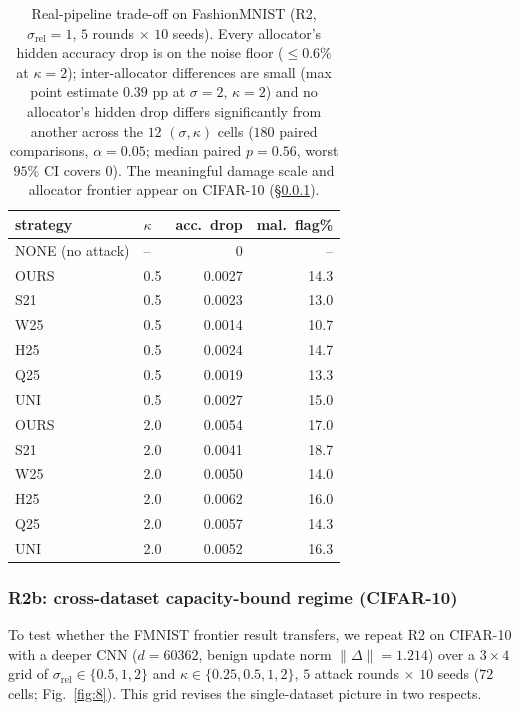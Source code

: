 \documentclass[final,1p,times]{elsarticle}
\begin{document}
\begin{table}[!t]
\centering
\caption{Real-pipeline trade-off on FashionMNIST (R2, $\sigma_{\mathrm{rel}}{=}1$,
$5$ rounds $\times$ $10$ seeds). Every allocator's hidden accuracy drop is
on the noise floor ($\le 0.6\%$ at $\kappa{=}2$); inter-allocator
differences are small (max point estimate $0.39$ pp at $\sigma{=}2$, $\kappa{=}2$)
and no allocator's hidden drop differs significantly from another across the
$12$ $(\sigma,\kappa)$ cells ($180$ paired comparisons, $\alpha{=}0.05$; median
paired $p{=}0.56$, worst $95\%$ CI covers $0$). The meaningful
damage scale and allocator frontier appear on CIFAR-10 (\S\ref{sec:r2b}).}
\label{tab:r2}
\begin{tabular}{llrr}
\toprule
strategy & $\kappa$ & acc.\ drop & mal.\ flag\%\\
\midrule
NONE (no attack) & -- & 0 & --\\
OURS & 0.5 & 0.0027 & 14.3\\
S21  & 0.5 & 0.0023 & 13.0\\
W25  & 0.5 & 0.0014 & 10.7\\
H25  & 0.5 & 0.0024 & 14.7\\
Q25  & 0.5 & 0.0019 & 13.3\\
UNI  & 0.5 & 0.0027 & 15.0\\
\midrule
OURS & 2.0 & 0.0054 & 17.0\\
S21  & 2.0 & 0.0041 & 18.7\\
W25  & 2.0 & 0.0050 & 14.0\\
H25  & 2.0 & 0.0062 & 16.0\\
Q25  & 2.0 & 0.0057 & 14.3\\
UNI  & 2.0 & 0.0052 & 16.3\\
\bottomrule
\end{tabular}
\end{table}

\subsubsection{R2b: cross-dataset capacity-bound regime (CIFAR-10)}
\label{sec:r2b}
To test whether the FMNIST frontier result transfers, we repeat R2 on
CIFAR-10 with a deeper CNN ($d{=}60362$, benign update norm
$\|\Delta\|{=}1.214$) over a $3{\times}4$ grid of
$\sigma_{\mathrm{rel}}{\in}\{0.5,1,2\}$ and
$\kappa{\in}\{0.25,0.5,1,2\}$, $5$ attack rounds $\times$ $10$ seeds
($72$ cells; Fig.~\ref{fig:8}). This grid revises the single-dataset
picture in two respects.
\end{document}
